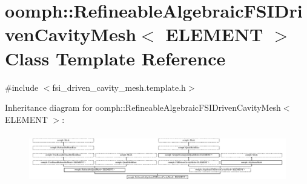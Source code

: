 \hypertarget{classoomph_1_1RefineableAlgebraicFSIDrivenCavityMesh}{}\section{oomph\+:\+:Refineable\+Algebraic\+F\+S\+I\+Driven\+Cavity\+Mesh$<$ E\+L\+E\+M\+E\+NT $>$ Class Template Reference}
\label{classoomph_1_1RefineableAlgebraicFSIDrivenCavityMesh}


{\ttfamily \#include $<$fsi\+\_\+driven\+\_\+cavity\+\_\+mesh.\+template.\+h$>$}

Inheritance diagram for oomph\+:\+:Refineable\+Algebraic\+F\+S\+I\+Driven\+Cavity\+Mesh$<$ E\+L\+E\+M\+E\+NT $>$\+:\begin{figure}[H]
\begin{center}
\leavevmode
\includegraphics[height=2.187500cm]{classoomph_1_1RefineableAlgebraicFSIDrivenCavityMesh}
\end{center}
\end{figure}
